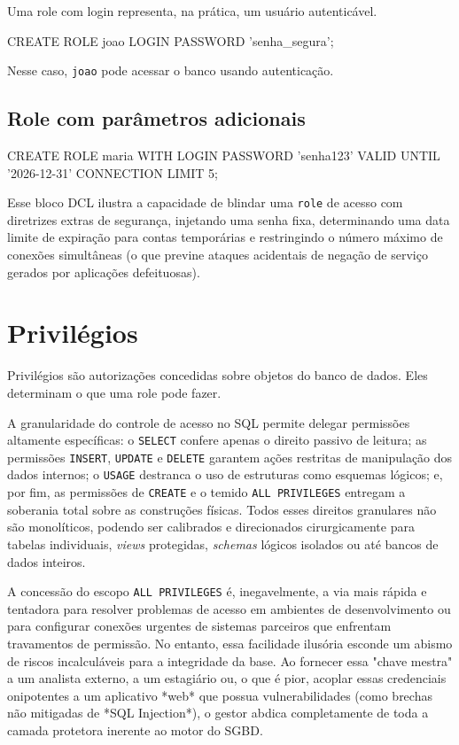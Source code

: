 Uma role com login representa, na prática, um usuário autenticável.

\begin{sqlcode}
CREATE ROLE joao LOGIN PASSWORD 'senha_segura';
\end{sqlcode}

Nesse caso, \texttt{joao} pode acessar o banco usando autenticação.

\subsection{Role com parâmetros adicionais}

\begin{sqlcode}
CREATE ROLE maria
WITH
LOGIN
PASSWORD 'senha123'
VALID UNTIL '2026-12-31'
CONNECTION LIMIT 5;
\end{sqlcode}

Esse bloco DCL ilustra a capacidade de blindar uma \texttt{role} de acesso com diretrizes extras de segurança, injetando uma senha fixa, determinando uma data limite de expiração para contas temporárias e restringindo o número máximo de conexões simultâneas (o que previne ataques acidentais de negação de serviço gerados por aplicações defeituosas).

\section{Privilégios}

Privilégios são autorizações concedidas sobre objetos do banco de dados. Eles determinam o que uma role pode fazer.

A granularidade do controle de acesso no SQL permite delegar permissões altamente específicas: o \texttt{SELECT} confere apenas o direito passivo de leitura; as permissões \texttt{INSERT}, \texttt{UPDATE} e \texttt{DELETE} garantem ações restritas de manipulação dos dados internos; o \texttt{USAGE} destranca o uso de estruturas como esquemas lógicos; e, por fim, as permissões de \texttt{CREATE} e o temido \texttt{ALL PRIVILEGES} entregam a soberania total sobre as construções físicas. Todos esses direitos granulares não são monolíticos, podendo ser calibrados e direcionados cirurgicamente para tabelas individuais, \textit{views} protegidas, \textit{schemas} lógicos isolados ou até bancos de dados inteiros.

A concessão do escopo \texttt{ALL PRIVILEGES} é, inegavelmente, a via mais rápida e tentadora para resolver problemas de acesso em ambientes de desenvolvimento ou para configurar conexões urgentes de sistemas parceiros que enfrentam travamentos de permissão. No entanto, essa facilidade ilusória esconde um abismo de riscos incalculáveis para a integridade da base. Ao fornecer essa "chave mestra" a um analista externo, a um estagiário ou, o que é pior, acoplar essas credenciais onipotentes a um aplicativo *web* que possua vulnerabilidades (como brechas não mitigadas de *SQL Injection*), o gestor abdica completamente de toda a camada protetora inerente ao motor do SGBD.

